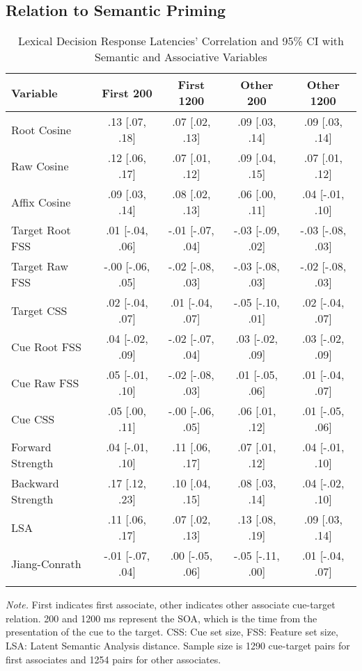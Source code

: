 \documentclass[english,,man]{apa6}
\theoremstyle{definition}
\theoremstyle{definition}
\theoremstyle{definition}
\theoremstyle{remark}
\begin{document}
\hypertarget{relation-to-semantic-priming}{%
\subsection{Relation to Semantic
Priming}\label{relation-to-semantic-priming}}

\begin{table}[tbp]
\begin{center}
\begin{threeparttable}
\caption{\label{tab:ldt-table}Lexical Decision Response Latencies' Correlation and 95\% CI with Semantic and Associative Variables}
\small{
\begin{tabular}{lcccc}
\toprule
Variable & \multicolumn{1}{c}{First 200} & \multicolumn{1}{c}{First 1200} & \multicolumn{1}{c}{Other 200} & \multicolumn{1}{c}{Other 1200}\\
\midrule
Root Cosine & .13 [.07, .18] & .07 [.02, .13] & .09 [.03, .14] & .09 [.03, .14]\\
Raw Cosine & .12 [.06, .17] & .07 [.01, .12] & .09 [.04, .15] & .07 [.01, .12]\\
Affix Cosine & .09 [.03, .14] & .08 [.02, .13] & .06 [.00, .11] & .04 [-.01, .10]\\
Target Root FSS & .01 [-.04, .06] & -.01 [-.07, .04] & -.03 [-.09, .02] & -.03 [-.08, .03]\\
Target Raw FSS & -.00 [-.06, .05] & -.02 [-.08, .03] & -.03 [-.08, .03] & -.02 [-.08, .03]\\
Target CSS & .02 [-.04, .07] & .01 [-.04, .07] & -.05 [-.10, .01] & .02 [-.04, .07]\\
Cue Root FSS & .04 [-.02, .09] & -.02 [-.07, .04] & .03 [-.02, .09] & .03 [-.02, .09]\\
Cue Raw FSS & .05 [-.01, .10] & -.02 [-.08, .03] & .01 [-.05, .06] & .01 [-.04, .07]\\
Cue CSS & .05 [.00, .11] & -.00 [-.06, .05] & .06 [.01, .12] & .01 [-.05, .06]\\
Forward Strength & .04 [-.01, .10] & .11 [.06, .17] & .07 [.01, .12] & .04 [-.01, .10]\\
Backward Strength & .17 [.12, .23] & .10 [.04, .15] & .08 [.03, .14] & .04 [-.02, .10]\\
LSA & .11 [.06, .17] & .07 [.02, .13] & .13 [.08, .19] & .09 [.03, .14]\\
Jiang-Conrath & -.01 [-.07, .04] & .00 [-.05, .06] & -.05 [-.11, .00] & .01 [-.04, .07]\\
\bottomrule
\addlinespace
\end{tabular}
}
\begin{tablenotes}[para]
\normalsize{\textit{Note.} First indicates first associate, other indicates other associate cue-target relation. 200 and 1200 ms represent the SOA, which is the time from the presentation of the cue to the target. CSS: Cue set size, FSS: Feature set size, LSA: Latent Semantic Analysis distance. Sample size is 1290 cue-target pairs for first associates and 1254 pairs for other associates.}
\end{tablenotes}
\end{threeparttable}
\end{center}
\end{table}
\end{document}
